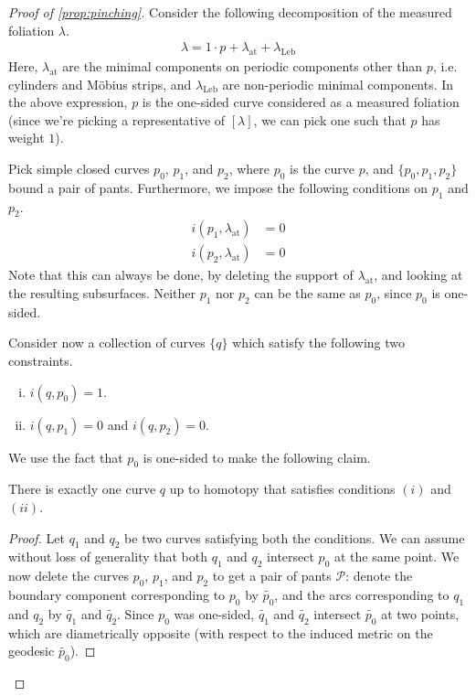 \begin{proof}[Proof of \autoref{prop:pinching}]
  Consider the following decomposition of the measured foliation $\lambda$.
  \begin{align*}
    \lambda = 1 \cdot p + \lambda_{\mathrm{at}} + \lambda_{\mathrm{Leb}}
  \end{align*}
  Here, $\lambda_{\mathrm{at}}$ are the minimal components on periodic components other than $p$, i.e. cylinders and Möbius strips, and $\lambda_{\mathrm{Leb}}$ are non-periodic minimal components.
  In the above expression, $p$ is the one-sided curve considered as a measured foliation (since we're picking a representative of $[\lambda]$, we can pick one such that $p$ has weight $1$).

  Pick simple closed curves $p_0$, $p_1$, and $p_2$, where $p_0$ is the curve $p$, and $\{p_0, p_1, p_2\}$ bound a pair of pants.
  Furthermore, we impose the following conditions on $p_1$ and $p_2$.
  \begin{align*}
    i(p_1, \lambda_{\mathrm{at}}) &= 0 \\
    i(p_2, \lambda_{\mathrm{at}}) &= 0
  \end{align*}
  Note that this can always be done, by deleting the support of $\lambda_{\mathrm{at}}$, and looking at the resulting subsurfaces.
  Neither $p_1$ nor $p_2$ can be the same as $p_0$, since $p_0$ is one-sided.

  Consider now a collection of curves $\{q\}$ which satisfy the following two constraints.
  \begin{enumerate}[(i)]
  \item $i(q, p_0) = 1$.
  \item $i(q, p_1) = 0$ and $i(q, p_2) = 0$.
  \end{enumerate}
  We use the fact that $p_0$ is one-sided to make the following claim.
  \begin{claim}
    \label{claim:one-sided-rigidity}
    There is exactly one curve $q$ up to homotopy that satisfies conditions $(i)$ and $(ii)$.
  \end{claim}
  \begin{proof}
    Let $q_1$ and $q_2$ be two curves satisfying both the conditions.
    We can assume without loss of generality that both $q_1$ and $q_2$ intersect $p_0$ at the same point.
    We now delete the curves $p_0$, $p_1$, and $p_2$ to get a pair of pants $\mathcal{P}$: denote the boundary component corresponding to $p_0$ by $\widetilde{p_0}$, and the arcs corresponding to $q_1$ and $q_2$ by $\widetilde{q_1}$ and $\widetilde{q_2}$.
    Since $p_0$ was one-sided, $\widetilde{q_1}$ and $\widetilde{q_2}$ intersect $\widetilde{p_0}$ at two points, which are diametrically opposite (with respect to the induced metric on the geodesic $\widetilde{p_0}$).


\end{proof}
\end{proof}
